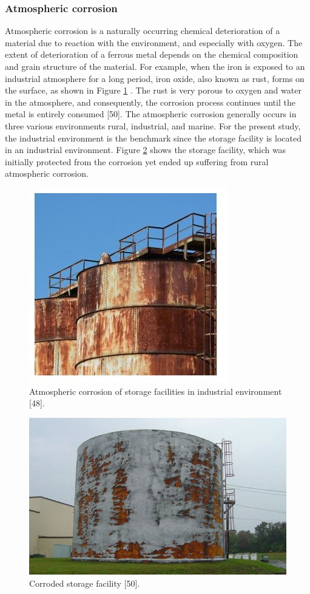 \documentclass[12pt]{report}
\begin{document}
\subsubsection{Atmospheric corrosion}
Atmospheric corrosion is a naturally occurring chemical deterioration of a material due to reaction with the environment, and especially with oxygen. The extent of deterioration of a ferrous metal depends on the chemical composition and grain structure of the material. For example, when the iron is exposed to an industrial atmosphere for a long period, iron oxide, also known as rust, forms on the surface, as shown in Figure \ref{ch3:figure:corrosion} \cite{mcarthur2004engineering}. The rust is very porous to oxygen and water in the atmosphere, and consequently, the corrosion process continues until the metal is entirely consumed [50].  The atmospheric corrosion generally occurs in three various environments rural, industrial, and marine. For the present study, the industrial environment is the benchmark since the storage facility is located in an industrial environment. Figure \ref{ch3:figure:corroded} shows the storage facility, which was initially protected from the corrosion yet ended up suffering from rural atmospheric corrosion.

\begin{figure}[H]
    \centering
    \includegraphics[width=.4\textwidth]{corrosion_of_storage_facilities.jpg}
    \caption{Atmospheric corrosion of storage facilities in industrial environment [48].}
    \label{ch3:figure:corrosion}
\end{figure}
 
\begin{figure}[H]
    \centering
    \includegraphics[width=\textwidth]{corroded_storage.jpg}
    \caption{Corroded storage facility [50].}
    \label{ch3:figure:corroded}
\end{figure}
\end{document}
